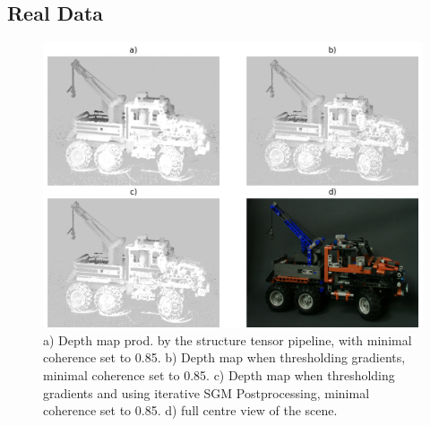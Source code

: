 \documentclass  [
  paper    = a4,
  BCOR     = 10mm,
  twoside,
  fontsize = 12pt,
  fleqn,
  toc      = bibnumbered,
  toc      = listofnumbered,
  numbers  = noendperiod,
  headings = normal,
  listof   = leveldown,
  version  = 3.03
]                                       {scrreprt}
\begin{document}
\begin{appendix}
\chapter{Real Data}
\label{sec:realdata_appendix}
\begin{figure}
	\centering
	\includegraphics[width=1\linewidth]{images/truck_realdata}
	\caption[Truck with iterative SGM]{a) Depth map prod. by the structure tensor pipeline, with minimal coherence set to 0.85. b) Depth map when thresholding gradients, minimal coherence set to 0.85. c) Depth map when thresholding gradients and using iterative SGM Postprocessing, minimal coherence set to 0.85.  d) full centre view of the scene.}
	\label{fig:truckrealdata}
\end{figure}

\end{appendix}
\end{document}
